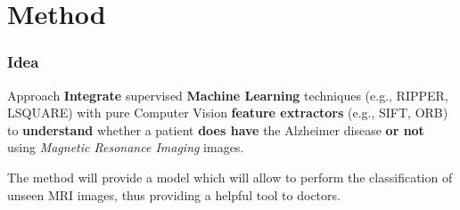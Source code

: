 \section{Method}

\begin{frame}
	\frametitle{Idea}
	
	\Large
	
	\vspace{0.4cm}
	
	\begin{block}{Approach}
		\textbf{Integrate} supervised \textbf{Machine Learning} techniques (e.g., RIPPER, LSQUARE) with
		pure Computer Vision \textbf{feature extractors} (e.g., SIFT, ORB) to \textbf{understand} whether
		a patient \textbf{does have} the Alzheimer disease \textbf{or not} using \emph{Magnetic Resonance
		Imaging} images.
	\end{block}
	
	\vspace{0.2cm}
	
	The method will provide a model which will allow to perform the classification of unseen MRI images,
	thus providing a helpful tool to doctors. \\
\end{frame}

